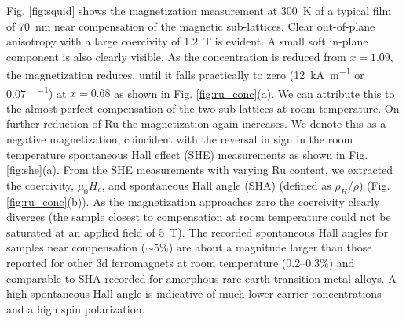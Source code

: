 \documentclass[reprint,aip,apl,floatfix,linenumbers,superscriptaddress]{revtex4-1}
\begin{document}
Fig. \ref{fig:squid} shows the magnetization measurement at \SI{300}{\kelvin} of a typical  film of \SI{70}{\nano\metre} near compensation of the magnetic sub-lattices. Clear out-of-plane anisotropy with a large coercivity of \SI{1.2}{\tesla} is evident.  A small soft in-plane component is also clearly visible. As the  concentration is reduced from $x=\num{1.09}$, the magnetization reduces, until it falls practically to zero (\SI{12}{\kilo\ampere\per\metre} or \SI{0.07}{\BohrMagneton\per\formulaunit}) at $x=\num{0.68}$ as shown in Fig. \ref{fig:ru_conc}(a). We can attribute this to the almost perfect compensation of the two  sub-lattices at room temperature. On further reduction of Ru the magnetization again increases. We denote this as a negative magnetization, coincident with the reversal in sign in the room temperature spontaneous Hall effect (SHE) measurements as shown in Fig. \ref{fig:she}(a). From the SHE measurements with varying Ru content, we extracted the coercivity, $\mu_0H_c$, and spontaneous Hall angle (SHA) (defined as $\rho_H$/$\rho$) (Fig. \ref{fig:ru_conc}(b)). As the magnetization approaches zero the coercivity clearly diverges (the sample closest to compensation at room temperature could not be saturated at an applied field of \SI{5}{\tesla}). The recorded spontaneous Hall angles for samples near compensation ($\sim \num{5}\%$) are about a magnitude larger than those reported for other 3d ferromagnets at room temperature (\numrange{0.2}{0.3}\%)\cite{dorleijn1976} and comparable to SHA recorded for amorphous rare earth transition metal alloys\cite{Kim2001}. A high spontaneous Hall angle is indicative of much lower carrier concentrations and a high spin polarization.
\end{document}
